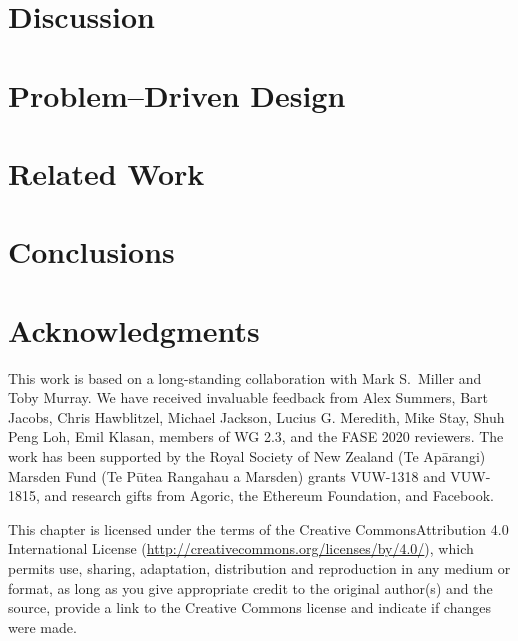 \documentclass[acmsmall]{acmart}
\newcommand{\sophia}[1]{#1} %
\newcommand{\susan}[1]{#1} %
\begin{document}
\section{Discussion}
\label{sect:discussion} 


\section{Problem--Driven Design}
\label{sect:problemdriven} 


\section{Related Work}
\label{sect:related}


\section{Conclusions}
\label{sect:conclusion}


\section{Acknowledgments}

\sophia{This work is based on a long-standing collaboration with Mark
  S.\ Miller and Toby Murray.
We have received invaluable feedback from Alex Summers, Bart Jacobs,  Chris Hawblitzel,
Michael Jackson, Lucius G. Meredith,
Mike Stay, Shuh Peng Loh,  Emil Klasan, members of WG 2.3, 
and the FASE 2020  reviewers.
The work has been supported by the 
Royal Society of New Zealand (Te Ap\={a}rangi) Marsden Fund (Te P\={u}tea Rangahau a Marsden)
grants VUW-1318 and VUW-1815, and research gifts from Agoric\susan{, the Ethereum Foundation,} and
Facebook.}







\vfill

{\small\medskip{} This chapter is licensed under the terms of the Creative Commons\break Attribution 4.0 International License (\url{http://creativecommons.org/licenses/by/4.0/}), which permits use, sharing, adaptation, distribution and reproduction in any medium or format, as long as you give appropriate credit to the original author(s) and the source, provide a link to the Creative Commons license and indicate if changes were made.}
\end{document}
